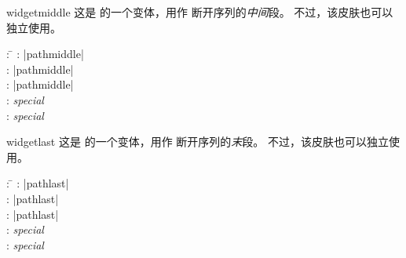 \begin{dispExample}
\end{dispExample}

\medskip

\begin{docSkin}{widgetmiddle}
这是  的一个变体，用作  断开序列的\emph{中间}段。
不过，该皮肤也可以独立使用。
\begin{tcolorbox}[skintable=widgetmiddle]
  \begin{tabbing}
    : \=\kill
    :           \> |pathmiddle|\\
    : \> |pathmiddle|\\ 
    :        \> |pathmiddle|\\
    :    \> \emph{special}\\
    :           \> \emph{special}
  \end{tabbing}
\end{tcolorbox}
\end{docSkin}

\begin{dispExample}
\end{dispExample}


\clearpage
\begin{docSkin}{widgetlast}
这是  的一个变体，用作  断开序列的\emph{末}段。
不过，该皮肤也可以独立使用。
\begin{tcolorbox}[skintable=widgetlast]
  \begin{tabbing}
    : \=\kill
    :           \> |pathlast|\\
    : \> |pathlast|\\ 
    :        \> |pathlast|\\
    :    \> \emph{special}\\
    :           \> \emph{special}
  \end{tabbing}
\end{tcolorbox}
\end{docSkin}


\begin{dispExample}
\end{dispExample}


